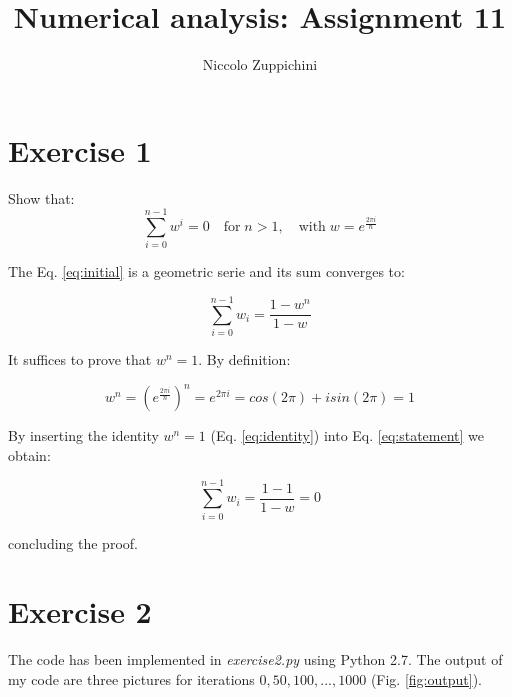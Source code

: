 \documentclass[12pt]{article}
\title{Numerical analysis: Assignment 11}
\author{Niccolo Zuppichini}
\begin{document}
\maketitle

\section*{Exercise 1}

Show that: \\

\begin{equation}
	\sum_{i=0}^{n-1} w^i = 0 \quad \textrm{for} \; n > 1, \quad \textrm{with} \; 
	w = e^{ \frac{2 \pi i}{n} }
	\label{eq:initial}
\end{equation}

The Eq. \ref{eq:initial} is a geometric serie and its sum converges to: 

\begin{equation}
	\sum_{i=0}^{n-1} w_i = \frac{1 - w^{n}}{1 - w}
	\label{eq:statement}
\end{equation}
 
It suffices to prove that $w^n = 1$. By definition:

\begin{equation}
	w^n = (e^{ \frac{2 \pi i}{n} } )^n = e^{2 \pi i} = cos(2 \pi) + i sin(2 \pi) = 1
	\label{eq:identity}
\end{equation}

By inserting the identity $w^n = 1$ (Eq. \ref{eq:identity}) into Eq. \ref{eq:statement} we obtain:

\begin{equation}
	\sum_{i=0}^{n-1} w_i = \frac{1 - 1}{1 - w} = 0
	\label{eq:result} 
\end{equation}

concluding the proof.

\section*{Exercise 2}

The code has been implemented in \textit{exercise2.py} using Python 2.7. The output of my code are three pictures for iterations $0, 50, 100, ..., 1000$ (Fig. \ref{fig:output}).
\end{document}
